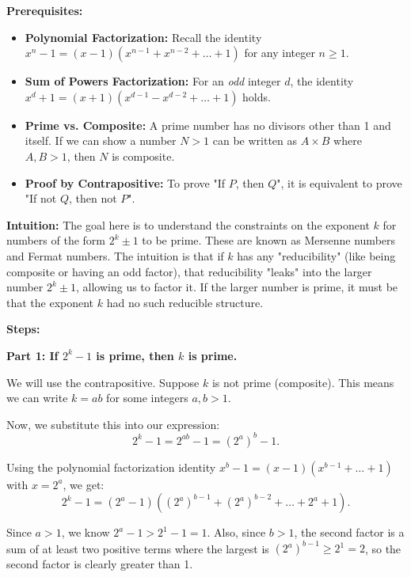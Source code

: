 \begin{solution}
\textbf{Prerequisites:}
\begin{itemize}
    \item \textbf{Polynomial Factorization:} Recall the identity $x^n - 1 = (x-1)(x^{n-1} + x^{n-2} + \dots + 1)$ for any integer $n \geq 1$.
    \item \textbf{Sum of Powers Factorization:} For an \textit{odd} integer $d$, the identity $x^d + 1 = (x+1)(x^{d-1} - x^{d-2} + \dots + 1)$ holds.
    \item \textbf{Prime vs. Composite:} A prime number has no divisors other than 1 and itself. If we can show a number $N > 1$ can be written as $A \times B$ where $A, B > 1$, then $N$ is composite.
    \item \textbf{Proof by Contrapositive:} To prove "If $P$, then $Q$", it is equivalent to prove "If not $Q$, then not $P$".
\end{itemize}

\bigskip

\textbf{Intuition:}
The goal here is to understand the constraints on the exponent $k$ for numbers of the form $2^k \pm 1$ to be prime. These are known as Mersenne numbers and Fermat numbers. The intuition is that if $k$ has any "reducibility" (like being composite or having an odd factor), that reducibility "leaks" into the larger number $2^k \pm 1$, allowing us to factor it. If the larger number is prime, it must be that the exponent $k$ had no such reducible structure.

\bigskip

\textbf{Steps:}

\textbf{Part 1: If $2^k - 1$ is prime, then $k$ is prime.}

We will use the contrapositive. Suppose $k$ is not prime (composite). This means we can write $k = ab$ for some integers $a, b > 1$.

\bigskip

Now, we substitute this into our expression:
\[ 2^k - 1 = 2^{ab} - 1 = (2^a)^b - 1. \]

\bigskip

Using the polynomial factorization identity $x^b - 1 = (x-1)(x^{b-1} + \dots + 1)$ with $x = 2^a$, we get:
\[ 2^k - 1 = (2^a - 1)( (2^a)^{b-1} + (2^a)^{b-2} + \dots + 2^a + 1). \]

\bigskip

Since $a > 1$, we know $2^a - 1 > 2^1 - 1 = 1$. Also, since $b > 1$, the second factor is a sum of at least two positive terms where the largest is $(2^a)^{b-1} \geq 2^1 = 2$, so the second factor is clearly greater than 1.


\end{solution}
